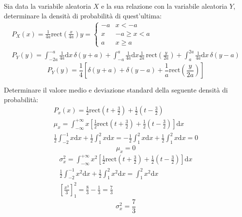 \documentclass{article}
\newcommand{\rect}{\mbox{rect}}
\newcommand{\df}{\mathrm{d}}
\begin{document}
Sia data la variabile aleatoria $X$ e la sua relazione con la variabile aleatoria $Y$, determinare la densità di probabilità di quest'ultima:
\begin{gather*}
    P_X(x)=\frac{1}{4a}\rect\left(\frac{x}{4a}\right)
    y=\begin{cases}
        -a&x<-a\\
        x&-a\geq x<a\\
        a&x\geq a
    \end{cases}\\
    P_Y(y)=\displaystyle\int_{-2a}^{-a}\frac{1}{4a}\df x\,\delta(y+a)+\int_{-a}^a\frac{1}{4a}\df x\frac{1}{2a}\,\rect\left(\frac{y}{2a}\right)+\int_{a}^{2a}\frac{1}{4a}\df x\,\delta(y-a)
\end{gather*}
\begin{equation}
    P_Y(y)=\displaystyle\frac{1}{4}\left[\delta(y+a)+\delta(y-a)+\frac{1}{a}\rect\left(\frac{y}{2a}\right)\right]
\end{equation}

Determinare il valore medio e deviazione standard della seguente densità di probabilità:
\begin{gather*}
    P_x(x)=\displaystyle\frac{1}{2}\rect\left({t+\frac{3}{2}}\right)+\frac{1}{2}\left({t-\frac{3}{2}}\right)\\
    \mu_x=\displaystyle\int_{-\infty}^{+\infty}x\left[\frac{1}{2}\rect\left({t+\frac{3}{2}}\right)+\frac{1}{2}\left({t-\frac{3}{2}}\right)\right]\df x\\
    \displaystyle\frac{1}{2}\int_{-2}^{-1}x\df x+\frac{1}{2}\int_{1}^2x\df x=-\frac{1}{2}\int_1^2x\df x+\frac{1}{2}\int_1^2x\df x=0
\end{gather*}
\begin{equation}
    \mu_x=0
\end{equation}
\begin{gather*}
    \sigma_x^2=\displaystyle\int_{-\infty}^{+\infty}x^2\left[\frac{1}{2}\rect\left({t+\frac{3}{2}}\right)+\frac{1}{2}\left({t-\frac{3}{2}}\right)\right]\df x\\
    \displaystyle\frac{1}{2}\int_{-2}^{-1}x^2\df x+\frac{1}{2}\int_1^2x^2\df x=\int_1^2x^2\df x\\
    \displaystyle\left[\frac{x^3}{3}\right]_1^2=\frac{8}{3}-\frac{1}{3}=\frac{7}{3}
\end{gather*}
\begin{equation}
    \sigma_x^2=\displaystyle\frac{7}{3}
\end{equation}
\end{document}
